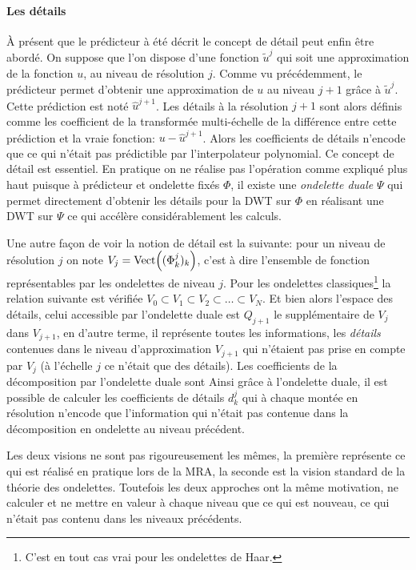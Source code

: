         \paragraph{Les détails}
            À présent que le prédicteur à été décrit le concept de détail peut enfin être abordé. On suppose que l'on dispose d'une fonction $\tilde u^j$
            qui soit une approximation de la fonction $u$, au niveau de résolution $j$. Comme vu précédemment, le prédicteur permet d'obtenir une approximation 
            de $u$ au niveau $j+1$ grâce à $\tilde u^j$. Cette prédiction est noté $\hat u^{j+1}$. Les détails à la résolution $j+1$ sont alors définis comme les 
            coefficient de la transformée multi-échelle de la différence entre cette prédiction et la vraie fonction: $u-\hat u^{j+1}$.
            Alors les coefficients de détails n'encode que ce qui n'était pas prédictible par l'interpolateur polynomial. 
            Ce concept de détail est essentiel. 
            En pratique on ne réalise pas l'opération comme expliqué plus haut puisque à prédicteur et ondelette fixés $\Phi$, il existe une \textit{ondelette duale} $\Psi$
            qui permet directement d'obtenir les détails pour la DWT sur $\Phi$ en réalisant une DWT sur $\Psi$ ce qui accélère considérablement les calculs.\par
            Une autre façon de voir la notion de détail est la suivante:
            pour un niveau de résolution $j$ on note $V_j = \text{Vect}\Bigl((\Phi_k^j)_k\Bigr)$, c'est à dire l'ensemble de fonction 
            représentables par les ondelettes de niveau $j$.
            Pour les ondelettes classiques\footnote{C'est en tout cas vrai pour les ondelettes de Haar\cite{postePoly}.} la relation suivante est vérifiée
            $V_0 \subset V_1 \subset V_2 \subset \ldots \subset V_N$. Et bien alors l'espace des détails, celui accessible par l'ondelette duale est $Q_{j+1}$
            le supplémentaire de $V_j$ dans $V_{j+1}$, en d'autre terme, il représente toutes les informations, les \textit{détails} contenues dans 
            le niveau d'approximation $V_{j+1}$ qui n'étaient pas prise en compte par $V_j$ (à l'échelle $j$ ce n'était que des détails). 
            Les coefficients de la décomposition par l'ondelette duale sont  Ainsi grâce à l'ondelette duale, 
            il est possible de calculer les coefficients de détails $d_k^j$ qui à chaque montée en résolution n'encode que l'information qui n'était 
            pas contenue dans la décomposition en ondelette au niveau précédent.\par
            Les deux visions ne sont pas rigoureusement les mêmes, la première représente ce qui est réalisé en pratique lors de la MRA, la seconde 
            est la vision standard de la théorie des ondelettes. Toutefois les deux approches ont la même motivation, ne calculer et ne mettre en valeur à chaque
            niveau que ce qui est nouveau, ce qui n'était pas contenu dans les niveaux précédents.
        

